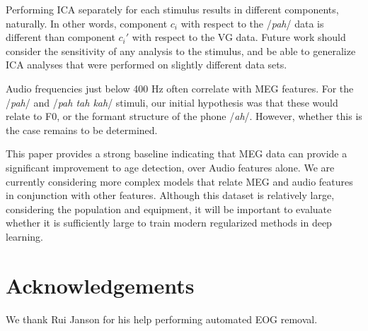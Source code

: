 \documentclass[utf8]{frontiersSCNS} %
\begin{document}
Performing ICA separately for each stimulus results in different components, naturally. In other words, component $c_i$ with respect to the /{\em pah}/ data is different than component $c_i'$ with respect to the VG data. Future work should consider the sensitivity of any analysis to the stimulus, and be able to generalize ICA analyses that were performed on slightly different data sets.

Audio frequencies just below 400 Hz often correlate with MEG features. For the /{\em pah}/ and /{\em pah tah kah}/ stimuli, our initial hypothesis was that these would relate to F0, or the formant structure of the phone /{\em ah}/. However, whether this is the case remains to be determined.


This paper provides a strong baseline indicating that MEG data can provide a significant improvement to age detection, over Audio features alone. We are currently considering more complex models that relate MEG and audio features in conjunction with other features. Although this dataset is relatively large, considering the population and equipment, it will be important to evaluate whether it is sufficiently large to train modern regularized methods in deep learning.

\section{Acknowledgements}

We thank Rui Janson for his help performing automated EOG removal.






\end{document}
